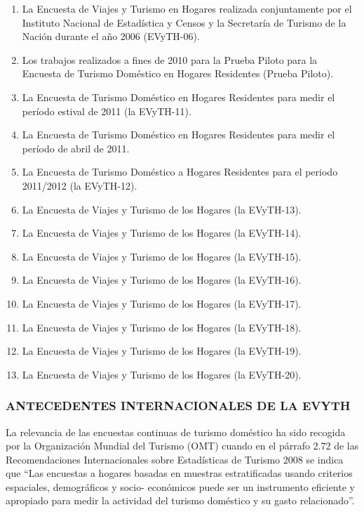 \documentclass[
  openany]{book}
\providecommand{\tightlist}{%
  \setlength{\itemsep}{0pt}\setlength{\parskip}{0pt}}
\begin{document}
\begin{enumerate}
\def\labelenumi{\arabic{enumi})}
\tightlist
\item
  La Encuesta de Viajes y Turismo en Hogares realizada conjuntamente
  por el Instituto Nacional de Estadística y Censos y la Secretaría de
  Turismo de la Nación durante el año 2006 (EVyTH-06).
\item
  Los trabajos realizados a fines de 2010 para la Prueba Piloto para
  la Encuesta de Turismo Doméstico en Hogares Residentes (Prueba
  Piloto).
\item
  La Encuesta de Turismo Doméstico en Hogares Residentes para medir el
  período estival de 2011 (la EVyTH-11).
\item
  La Encuesta de Turismo Doméstico en Hogares Residentes para medir el
  período de abril de 2011.
\item
  La Encuesta de Turismo Doméstico a Hogares Residentes para el
  periodo 2011/2012 (la EVyTH-12).
\item
  La Encuesta de Viajes y Turismo de los Hogares (la EVyTH-13).
\item
  La Encuesta de Viajes y Turismo de los Hogares (la EVyTH-14).
\item
  La Encuesta de Viajes y Turismo de los Hogares (la EVyTH-15).
\item
  La Encuesta de Viajes y Turismo de los Hogares (la EVyTH-16).
\item
  La Encuesta de Viajes y Turismo de los Hogares (la EVyTH-17).
\item
  La Encuesta de Viajes y Turismo de los Hogares (la EVyTH-18).
\item
  La Encuesta de Viajes y Turismo de los Hogares (la EVyTH-19).
\item
  La Encuesta de Viajes y Turismo de los Hogares (la EVyTH-20).
\end{enumerate}

\hypertarget{antecedentes-internacionales-de-la-evyth}{%
\subsubsection{\texorpdfstring{\textbf{ANTECEDENTES INTERNACIONALES DE LA EVYTH}}{ANTECEDENTES INTERNACIONALES DE LA EVYTH}}\label{antecedentes-internacionales-de-la-evyth}}

La relevancia de las encuestas continuas de turismo doméstico ha sido
recogida por la Organización Mundial del Turismo (OMT) cuando en el
párrafo 2.72 de las Recomendaciones Internacionales sobre Estadísticas
de Turismo 2008 se indica que ``Las encuestas a hogares basadas en
muestras estratificadas usando criterios espaciales, demográficos y
socio- económicos puede ser un instrumento eficiente y apropiado para
medir la actividad del turismo doméstico y su gasto relacionado''.
\end{document}
